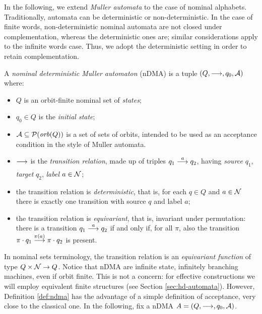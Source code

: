 
In the following, we extend \emph{Muller automata} to the case of nominal alphabets. Traditionally, automata can be deterministic or non-deterministic. In the case of finite words, non-deterministic nominal automata are not closed under complementation, whereas the deterministic ones are; similar considerations apply to the infinite words case. Thus, we adopt the deterministic setting in order to retain complementation.

\begin{definition}\label{def:ndma}
 A \emph{nominal deterministic Muller automaton} (nDMA) is a tuple $(Q,\overset{}{\longrightarrow},q_0,\mathcal{A})$ where:
 
  \begin{itemize}
  \item $Q$ is an orbit-finite nominal set of \emph{states};
  
  \item $q_0 \in Q$ is the \emph{initial state};
  
  \item $\mathcal{A} \subseteq \mathcal{P}(\mathit{orb}(Q))$ is a set of sets of orbits, intended to be used as an acceptance condition in the style of Muller automata.
  
  \item $\overset{}{\underset{}{\longrightarrow}}$ is the \emph{transition relation}, made up of triples $q_1 \overset{a}{\longrightarrow} q_2$, having \emph{source} $q_1$, \emph{target} $q_2$, \emph{label} $a \in \mathcal{N}$;
  
  \item the transition relation is \emph{deterministic}, that is, for each $q \in Q$ and $a \in \mathcal{N}$ there is exactly one transition with source $q$ and label $a$;
  
  \item the transition relation is \emph{equivariant}, that is, invariant under permutation: there is a transition $q_1 \overset{a}{\longrightarrow} q_2$ if and only if, for all $\pi$, also the transition $\pi \cdot q_1 \overset{\pi(a)}{\longrightarrow} \pi \cdot q_2$ is present.
 \end{itemize}
\end{definition}
%
In nominal sets terminology, the transition relation is an \emph{equivariant function} of type $Q \times \mathcal{N} \to Q$.  Notice that nDMA are infinite state, infinitely branching machines, even if orbit finite. This is not a concern: for effective constructions we will employ equivalent finite structures (see Section \ref{sec:hd-automata}). However, Definition \ref{def:ndma} has the advantage of a simple definition of acceptance, very close to the classical one. In the following, fix a nDMA $A=(Q,\overset{}{\longrightarrow},q_0,\mathcal{A})$.

